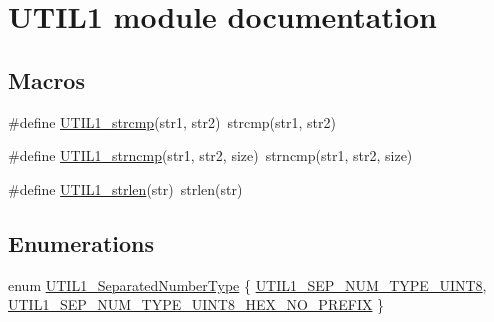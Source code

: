 \hypertarget{group___u_t_i_l1__module}{}\section{U\+T\+I\+L1 module documentation}
\label{group___u_t_i_l1__module}
\subsection*{Macros}
\begin{DoxyCompactItemize}
\item 
\#define \hyperlink{group___u_t_i_l1__module_gacc44a9f4c3b926c9b5993f5265a1cbd5}{U\+T\+I\+L1\+\_\+strcmp}(str1,  str2)~strcmp(str1, str2)
\item 
\#define \hyperlink{group___u_t_i_l1__module_gaa3275fde4ebb265b5756d98c4b9be5c2}{U\+T\+I\+L1\+\_\+strncmp}(str1,  str2,  size)~strncmp(str1, str2, size)
\item 
\#define \hyperlink{group___u_t_i_l1__module_ga16599fecc43cb5f4c66f1dd6060f6f0c}{U\+T\+I\+L1\+\_\+strlen}(str)~strlen(str)
\end{DoxyCompactItemize}
\subsection*{Enumerations}
\begin{DoxyCompactItemize}
\item 
enum \hyperlink{group___u_t_i_l1__module_gac119fea18ee711120d44fe056b99b364}{U\+T\+I\+L1\+\_\+\+Separated\+Number\+Type} \{ \hyperlink{group___u_t_i_l1__module_ggac119fea18ee711120d44fe056b99b364a01145cb731468d8ad74a728e09a842cb}{U\+T\+I\+L1\+\_\+\+S\+E\+P\+\_\+\+N\+U\+M\+\_\+\+T\+Y\+P\+E\+\_\+\+U\+I\+N\+T8}, 
\hyperlink{group___u_t_i_l1__module_ggac119fea18ee711120d44fe056b99b364a915a9a5c868e199ccbe6dbe0126177f0}{U\+T\+I\+L1\+\_\+\+S\+E\+P\+\_\+\+N\+U\+M\+\_\+\+T\+Y\+P\+E\+\_\+\+U\+I\+N\+T8\+\_\+\+H\+E\+X\+\_\+\+N\+O\+\_\+\+P\+R\+E\+F\+IX}
 \}
\end{DoxyCompactItemize}
